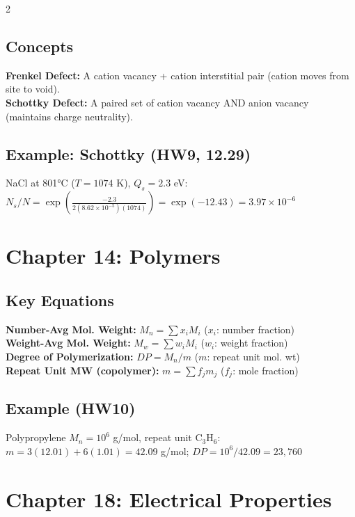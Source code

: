 \documentclass[7pt]{article}
\begin{document}
\begin{multicols*}{2}
\subsection*{Concepts}
\textbf{Frenkel Defect:} A cation vacancy + cation interstitial pair (cation moves from site to void). \\
\textbf{Schottky Defect:} A paired set of cation vacancy AND anion vacancy (maintains charge neutrality).

\subsection*{Example: Schottky (HW9, 12.29)}
NaCl at 801°C ($T=1074$ K), $Q_s=2.3$ eV: \\
$N_s/N = \exp\!\left(\frac{-2.3}{2(8.62\times10^{-5})(1074)}\right) = \exp(-12.43) = 3.97\times10^{-6}$

\section*{Chapter 14: Polymers}
\subsection*{Key Equations}
\textbf{Number-Avg Mol. Weight:} $M_n = \sum x_i M_i$ \quad ($x_i$: number fraction) \\
\textbf{Weight-Avg Mol. Weight:} $M_w = \sum w_i M_i$ \quad ($w_i$: weight fraction) \\
\textbf{Degree of Polymerization:} $DP = M_n / m$ \quad ($m$: repeat unit mol. wt) \\
\textbf{Repeat Unit MW (copolymer):} $m = \sum f_j m_j$ \quad ($f_j$: mole fraction)
\subsection*{Example (HW10)}
Polypropylene $M_n = 10^6$ g/mol, repeat unit C$_3$H$_6$: \\
$m = 3(12.01)+6(1.01) = 42.09$ g/mol; $DP = 10^6/42.09 = 23,760$

\section*{Chapter 18: Electrical Properties}

\end{multicols*}
\end{document}
